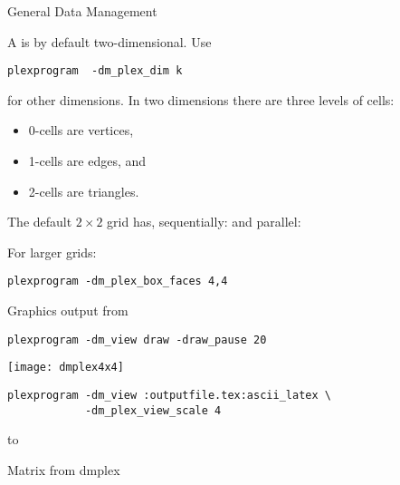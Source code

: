 
 {General Data Management}


A  is by default two-dimensional.
Use
\begin{verbatim}
plexprogram  -dm_plex_dim k
\end{verbatim}
for other dimensions.
In two dimensions there are three levels of cells:
\begin{itemize}
\item
  0-cells are vertices,
\item 1-cells are edges, and
\item 2-cells are triangles.
\end{itemize}

The default $2\times 2$ grid has, sequentially:
and parallel:

For larger grids:
\begin{verbatim}
plexprogram -dm_plex_box_faces 4,4
\end{verbatim}

\begin{multicols}{2}
  Graphics output from
\begin{verbatim}
plexprogram -dm_view draw -draw_pause 20
\end{verbatim}
\vfill\hbox{}
\columnbreak
\texttt{[image: dmplex4x4]}
\end{multicols}

\begin{verbatim}
plexprogram -dm_view :outputfile.tex:ascii_latex \
            -dm_plex_view_scale 4
\end{verbatim}

\hbox to 

 {Matrix from dmplex}

